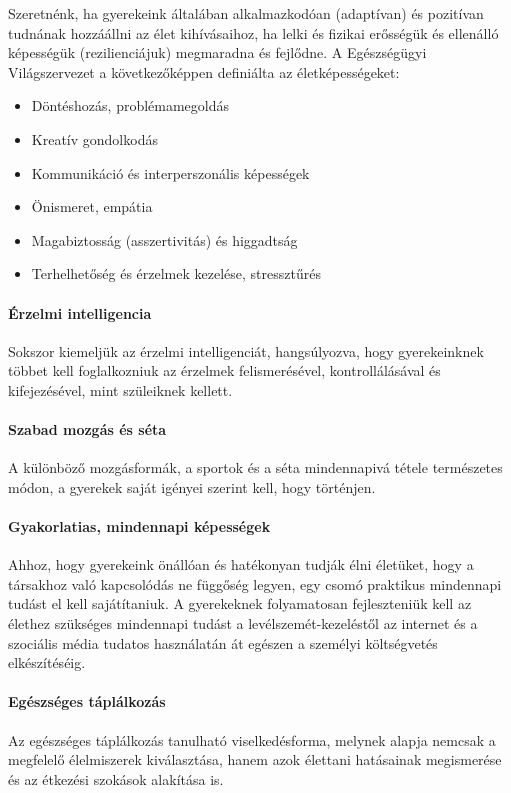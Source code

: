 Szeretnénk, ha gyerekeink általában alkalmazkodóan (adaptívan) és
pozitívan tudnának hozzáállni az élet kihívásaihoz, ha lelki és fizikai
erősségük és ellenálló képességük (rezilienciájuk) megmaradna és
fejlődne. A Egészségügyi Világszervezet {\autocite{WHO1999}} a
következőképpen definiálta az életképességeket:

\begin{itemize}
\item
  Döntéshozás, problémamegoldás
\item
  Kreatív gondolkodás
\item
  Kommunikáció és interperszonális képességek
\item
  Önismeret, empátia
\item
  Magabiztosság (asszertivitás) és higgadtság
\item
  Terhelhetőség és érzelmek kezelése, stressztűrés
\end{itemize}

\hypertarget{erzelmi-intelligencia}{%
\paragraph{Érzelmi intelligencia}\label{erzelmi-intelligencia}}

Sokszor kiemeljük az érzelmi intelligenciát, hangsúlyozva, hogy
gyerekeinknek többet kell foglalkozniuk az érzelmek felismerésével,
kontrollálásával és kifejezésével, mint szüleiknek kellett.

\hypertarget{szabad-mozgas-es-seta}{%
\paragraph{Szabad mozgás és séta}\label{szabad-mozgas-es-seta}}

A különböző mozgásformák, a sportok és a séta mindennapivá tétele
természetes módon, a gyerekek saját igényei szerint kell, hogy történjen.

\hypertarget{gyakorlatias-mindennapi-kepessegek}{%
\paragraph{Gyakorlatias, mindennapi
képességek}\label{gyakorlatias-mindennapi-kepessegek}}

Ahhoz, hogy gyerekeink önállóan és hatékonyan tudják élni életüket, hogy
a társakhoz való kapcsolódás ne függőség legyen, egy csomó praktikus
mindennapi tudást el kell sajátítaniuk. A gyerekeknek folyamatosan
fejleszteniük kell az élethez szükséges mindennapi tudást a
levélszemét-kezeléstől az internet és a szociális média tudatos
használatán át egészen a személyi költségvetés elkészítéséig.

\hypertarget{egeszseges-taplalkozas}{%
\paragraph{Egészséges táplálkozás}\label{egeszseges-taplalkozas}}

Az egészséges táplálkozás tanulható viselkedésforma, melynek alapja
nemcsak a megfelelő élelmiszerek kiválasztása, hanem azok élettani
hatásainak megismerése és az étkezési szokások alakítása is.
